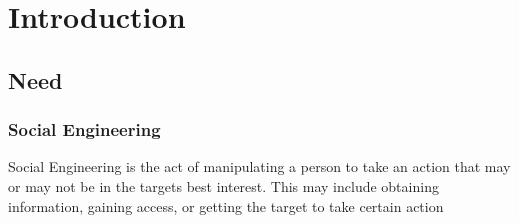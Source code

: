 


\chapter{Introduction}

\section{Need}

\subsection{Social Engineering}
Social Engineering is the act of manipulating a person to take an action that may or may not be in the targets best interest. This may include obtaining information, gaining access, or getting the target to take certain action\cite{book_se}

